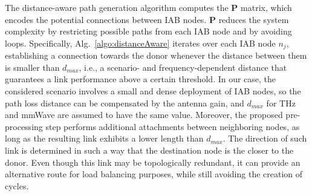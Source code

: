 The distance-aware path generation algorithm 
computes the $\bm{P}$ matrix, which encodes the potential connections between IAB nodes. $\bm{P}$ reduces the system complexity by restricting possible paths from each IAB node and by avoiding loops.
Specifically, Alg.~\ref{algo:distanceAware} iterates over each IAB node $n_j$, establishing a connection towards the donor whenever the distance between them is smaller than $d_{max}$, i.e., 
a scenario- and frequency-dependent distance that guarantees a link performance above a certain threshold.
In our case, the considered scenario involves a small and dense deployment of IAB nodes, so the path loss distance can be compensated by the antenna gain, and $d_{max}$ for THz and mmWave are assumed to have the same value.
Moreover, the proposed pre-processing step performs additional attachments between neighboring nodes, as long as the resulting link exhibits a lower length than $d_{max}$. The direction of such link is determined in such a way that the destination node is the closer to the donor.
Even though this link may be topologically redundant, it can provide an alternative route for load balancing purposes, while still avoiding the creation of cycles. 


